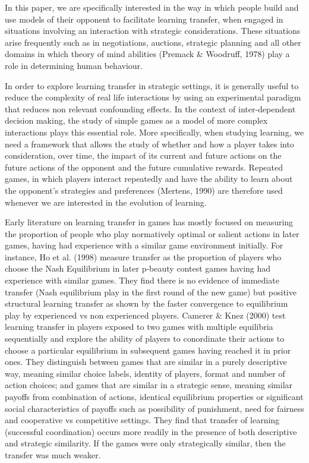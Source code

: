 \documentclass[12pt]{article}         %
\begin{document}
  In this paper, we are specifically interested in the way in which people build and use models of their opponent to facilitate learning transfer, when engaged in situations involving an interaction with strategic considerations. These situations arise frequently such as in negotiations, auctions, strategic planning and all other domains in which theory of mind abilities (Premack & Woodruff, 1978) play a role in determining human behaviour.  

In order to explore learning transfer in strategic settings,  it is generally useful to reduce the complexity of real life interactions by using an experimental paradigm that reduces non relevant confounding effects. In the context of inter-dependent decision making, the study of simple games as a model of more complex interactions plays this essential role. More specifically, when studying learning, we need a framework that allows the study of whether and how a player takes into consideration, over time, the impact of its current and future actions on the future actions of the opponent and the future cumulative rewards. Repeated games, in which players interact repeatedly and have the ability to learn about the opponent's strategies and preferences (Mertens, 1990) are therefore used whenever we are interested in the evolution of learning.  

Early literature on learning transfer in games has mostly focused on measuring the proportion of people who play normatively optimal or salient actions in later games, having had experience with a similar game environment initially. For instance, Ho et al. (1998) measure transfer as the proportion of players who choose the Nash Equilibrium in later p-beauty contest games having had experience with similar games. They find there is no evidence of immediate transfer (Nash equilibrium play in the first round of the new game) but positive structural learning transfer as shown by the faster convergence to equilibrium play by experienced vs non experienced players. Camerer & Knez (2000) test learning transfer in players exposed to two games with multiple equilibria sequentially and explore the ability of players to conordinate their actions to choose a particular equilibrium in subsequent games having reached it in prior ones. They distinguish between games that are similar in a purely descriptive way, meaning similar choice labels, identity of players, format and number of action choices; and games that are similar in a strategic sense, meaning similar payoffs from combination of actions, identical equilibrium properties or significant social characteristics of payoffs such as possibility of punishment, need for fairness and cooperative vs competitive settings. They find that transfer of learning (successful coordination) occurs more readily in the presence of both descriptive and strategic similarity. If the games were only strategically similar, then the transfer was much weaker.  
\end{document}
